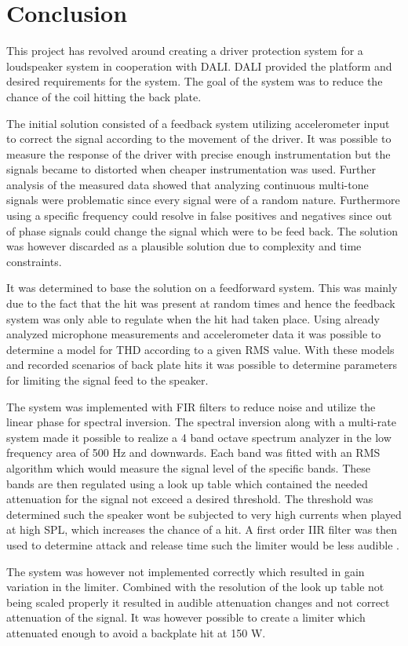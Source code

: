 \chapter{Conclusion}\label{cha:conclusion}
This project has revolved around creating a driver protection system for a loudspeaker system in cooperation with DALI. DALI provided the platform and desired requirements for the system. The goal of the system was to reduce the chance of the coil hitting the back plate.

The initial solution consisted of a feedback system utilizing accelerometer input to correct the signal according to the movement of the driver. It was possible to measure the response of the driver with precise enough instrumentation but the signals became to distorted when cheaper instrumentation was used. Further analysis of the measured data showed that analyzing continuous multi-tone signals were problematic since every signal were of a random nature. Furthermore using a specific frequency could resolve in false positives and negatives since out of phase signals could change the signal which were to be feed back. The solution was however discarded as a plausible solution due to complexity and time constraints.

It was determined to base the solution on a feedforward system. This was mainly due to the fact that the hit was present at random times and hence the feedback system was only able to regulate when the hit had taken place. Using already analyzed microphone measurements and accelerometer data it was possible to determine a model for THD according to a given RMS value. With these models and recorded scenarios of back plate hits it was possible to determine parameters for limiting the signal feed to the speaker. 

 The system was implemented with FIR filters to reduce noise and utilize the linear phase for spectral inversion. The spectral inversion along with a multi-rate system made it possible to realize a 4 band octave spectrum analyzer in the low frequency area of 500 Hz and downwards. Each band was fitted with an RMS algorithm which would measure the signal level of the specific bands. These bands are then regulated using a look up table which contained the needed attenuation for the signal not exceed a desired threshold. The threshold was determined such the speaker wont be subjected to very high currents when played at high SPL, which increases the chance of a hit. A first order IIR filter was then used to determine attack and release time such the limiter would be less audible .
 
 The system was however not implemented correctly which resulted in gain variation in the limiter. Combined with the resolution of the look up table not being scaled properly it resulted in audible attenuation changes and not correct attenuation of the signal. It was however possible to create a limiter which attenuated enough to avoid a backplate hit at 150 W.